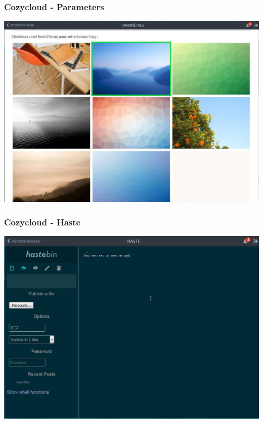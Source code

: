 \documentclass{beamer}
\begin{document}
\begin{frame}
\frametitle{Cozycloud - Parameters}
\includegraphics[scale=0.3] {./CozyCloud/CozyCloud_Parametres.jpg}
\end{frame}

\begin{frame}
\frametitle{Cozycloud - Haste}
\includegraphics[scale=0.3] {./CozyCloud/CozyCloud_Haste.jpg}
\end{frame}
\end{document}
